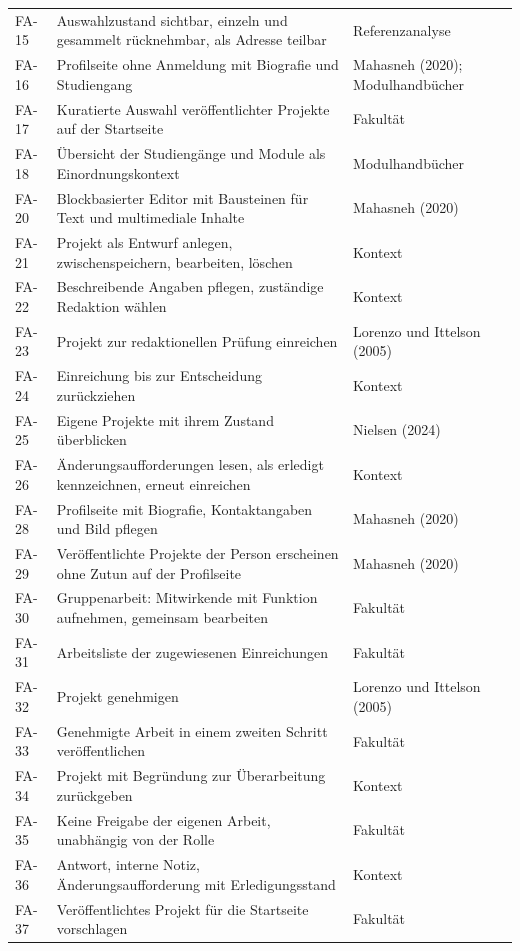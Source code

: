\begin{longtable}{@{}L{1.2cm}L{9.6cm}L{3.7cm}@{}}
	FA-15 & Auswahlzustand sichtbar, einzeln und gesammelt rücknehmbar, als Adresse teilbar & Referenzanalyse \\
	FA-16 & Profilseite ohne Anmeldung mit Biografie und Studiengang & Mahasneh (2020); Modulhandbücher \\
	FA-17 & Kuratierte Auswahl veröffentlichter Projekte auf der Startseite & Fakultät \\
	FA-18 & Übersicht der Studiengänge und Module als Einordnungskontext & Modulhandbücher \\
	FA-20 & Blockbasierter Editor mit Bausteinen für Text und multimediale Inhalte & Mahasneh (2020) \\
	FA-21 & Projekt als Entwurf anlegen, zwischenspeichern, bearbeiten, löschen & Kontext \\
	FA-22 & Beschreibende Angaben pflegen, zuständige Redaktion wählen & Kontext \\
	FA-23 & Projekt zur redaktionellen Prüfung einreichen & Lorenzo und Ittelson (2005) \\
	FA-24 & Einreichung bis zur Entscheidung zurückziehen & Kontext \\
	FA-25 & Eigene Projekte mit ihrem Zustand überblicken & Nielsen (2024) \\
	FA-26 & Änderungsaufforderungen lesen, als erledigt kennzeichnen, erneut einreichen & Kontext \\
	FA-28 & Profilseite mit Biografie, Kontaktangaben und Bild pflegen & Mahasneh (2020) \\
	FA-29 & Veröffentlichte Projekte der Person erscheinen ohne Zutun auf der Profilseite & Mahasneh (2020) \\
	FA-30 & Gruppenarbeit: Mitwirkende mit Funktion aufnehmen, gemeinsam bearbeiten & Fakultät \\
	FA-31 & Arbeitsliste der zugewiesenen Einreichungen & Fakultät \\
	FA-32 & Projekt genehmigen & Lorenzo und Ittelson (2005) \\
	FA-33 & Genehmigte Arbeit in einem zweiten Schritt veröffentlichen & Fakultät \\
	FA-34 & Projekt mit Begründung zur Überarbeitung zurückgeben & Kontext \\
	FA-35 & Keine Freigabe der eigenen Arbeit, unabhängig von der Rolle & Fakultät \\
	FA-36 & Antwort, interne Notiz, Änderungsaufforderung mit Erledigungsstand & Kontext \\
	FA-37 & Veröffentlichtes Projekt für die Startseite vorschlagen & Fakultät \\

\end{longtable}
